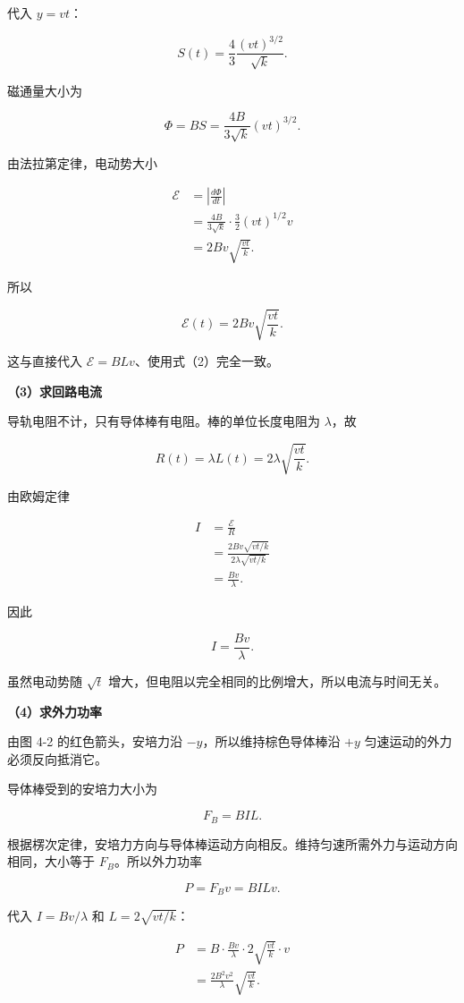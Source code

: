 \documentclass[12pt,a4paper,UTF8]{ctexart}
\begin{document}
代入 \(y=vt\)：

\[
S(t)=\frac43\frac{(vt)^{3/2}}{\sqrt k}.
\tag{5}
\]

磁通量大小为

\[
\Phi=B S=\frac{4B}{3\sqrt k}(vt)^{3/2}.
\]

由法拉第定律，电动势大小

\[
\begin{aligned}
\mathcal E
&=\left|\frac{d\Phi}{dt}\right|\\
&=\frac{4B}{3\sqrt k}\cdot\frac32(vt)^{1/2}v\\
&=2Bv\sqrt{\frac{vt}{k}}.
\end{aligned}
\]

所以

\[
\boxed{\mathcal E(t)=2Bv\sqrt{\frac{vt}{k}}}.
\tag{6}
\]

这与直接代入 \(\mathcal E=BLv\)、使用式（2）完全一致。

\textbf{（3）求回路电流}

导轨电阻不计，只有导体棒有电阻。棒的单位长度电阻为 \(\lambda\)，故

\[
R(t)=\lambda L(t)=2\lambda\sqrt{\frac{vt}{k}}.
\tag{7}
\]

由欧姆定律

\[
\begin{aligned}
I
&=\frac{\mathcal E}{R}\\
&=\frac{2Bv\sqrt{vt/k}}{2\lambda\sqrt{vt/k}}\\
&=\frac{Bv}{\lambda}.
\end{aligned}
\]

因此

\[
\boxed{I=\frac{Bv}{\lambda}}.
\tag{8}
\]

虽然电动势随 \(\sqrt t\)
增大，但电阻以完全相同的比例增大，所以电流与时间无关。

\textbf{（4）求外力功率}

由图 4-2 的红色箭头，安培力沿 \(-y\)，所以维持棕色导体棒沿 \(+y\)
匀速运动的外力必须反向抵消它。

导体棒受到的安培力大小为

\[
F_B=BIL.
\tag{9}
\]

根据楞次定律，安培力方向与导体棒运动方向相反。维持匀速所需外力与运动方向相同，大小等于
\(F_B\)。所以外力功率

\[
P=F_Bv=BILv.
\]

代入 \(I=Bv/\lambda\) 和 \(L=2\sqrt{vt/k}\)：

\[
\begin{aligned}
P
&=B\cdot\frac{Bv}{\lambda}\cdot2\sqrt{\frac{vt}{k}}\cdot v\\
&=\frac{2B^2v^2}{\lambda}\sqrt{\frac{vt}{k}}.
\end{aligned}
\]
\end{document}

